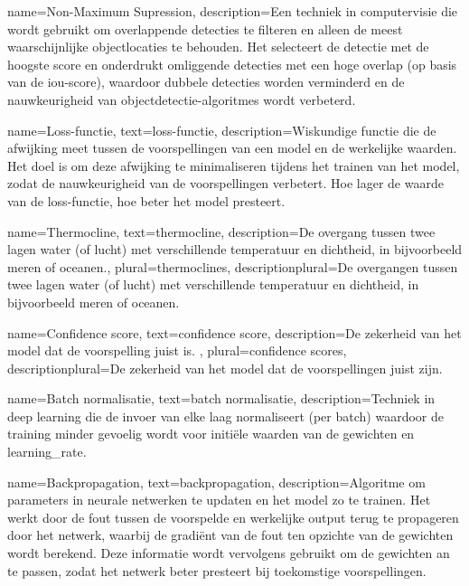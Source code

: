 {
    name={Non-Maximum Supression},
    description={Een techniek in computervisie die wordt gebruikt om overlappende detecties te filteren en alleen de meest waarschijnlijke objectlocaties te behouden. Het selecteert de detectie met de hoogste score en onderdrukt omliggende detecties met een hoge overlap (op basis van de \gls{iou}-score), waardoor dubbele detecties worden verminderd en de nauwkeurigheid van objectdetectie-algoritmes wordt verbeterd. \autocite{Geron_2023}}
}

{
    name={Loss-functie},
    text={loss-functie},
    description={Wiskundige functie die de afwijking meet tussen de voorspellingen van een model en de werkelijke waarden. Het doel is om deze afwijking te minimaliseren tijdens het trainen van het model, zodat de nauwkeurigheid van de voorspellingen verbetert. Hoe lager de waarde van de loss-functie, hoe beter het model presteert. \autocite{Geron_2023}}
}

{
    name={Thermocline},
    text={thermocline},
    description={De overgang tussen twee lagen water (of lucht) met verschillende temperatuur en dichtheid, in bijvoorbeeld meren of oceanen.},
    plural={thermoclines},
    descriptionplural={De overgangen tussen twee lagen water (of lucht) met verschillende temperatuur en dichtheid, in bijvoorbeeld meren of oceanen.}
}

{
    name={Confidence score},
    text={confidence score},
    description={De zekerheid van het model dat de voorspelling juist is. \autocite{Geron_2023}},
    plural={confidence scores},
    descriptionplural={De zekerheid van het model dat de voorspellingen juist zijn. \autocite{Geron_2023}}    
}

{
    name={Batch normalisatie},
    text={batch normalisatie},
    description={Techniek in deep learning die de invoer van elke laag normaliseert (per batch) waardoor de training minder gevoelig wordt voor initiële waarden van de gewichten en \gls{learning_rate}. \autocite{Geron_2023}}
}

{
    name={Backpropagation},
    text={backpropagation},
    description={Algoritme om parameters in neurale netwerken te updaten en het model zo te trainen. Het werkt door de fout tussen de voorspelde en werkelijke output terug te propageren door het netwerk, waarbij de gradiënt van de fout ten opzichte van de gewichten wordt berekend. Deze informatie wordt vervolgens gebruikt om de gewichten an te passen, zodat het netwerk beter presteert bij toekomstige voorspellingen. \autocite{Geron_2023}}
}